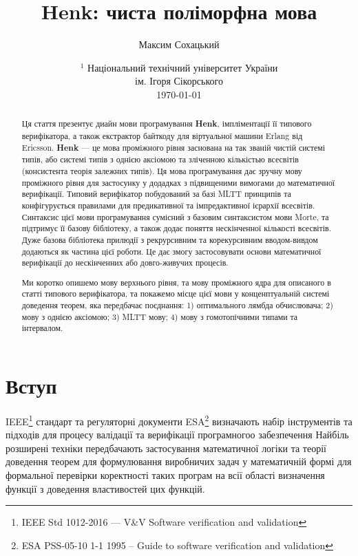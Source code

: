 \documentclass{article}
\begin{document}
\title{Henk: чиста поліморфна мова}
\author{Максим Сохацький}
\date{ $^1$ Національний технічний університет України \\
       \small ім. Ігоря Сікорського\\
       \today }

\maketitle

\begin{abstract}
Ця стаття презентує диайн мови програмування \textbf{Henk}, імпліментації її типового верифікатора,
а також екстрактор байткоду для віртуальної машини Erlang від Ericsson. \textbf{Henk} — це
мова проміжного рівня заснована на так званій чистій системі типів, або системі типів з однією аксіомою та
зліченною кількістью всесвітів (консистента теорія залежних типів). Ця мова програмування дає зручну
мову проміжного рівня для застосунку у додадках з підвищеними вимогами до математичної верифікації.
Типовий верифікатор побудований за базі MLTT принципів та конфігурується правилами для предикативної та імпредактивної ієрархії всесвітів.
Синтаксис цієї мови програмування сумісний з базовим синтаксистом мови Morte, та підтримує її базову бібліотеку,
а також додає поняття нескінченної кількості всесвітів. Дуже базова бібліотека прилюдії з рекрурсивним та
корекурсивним вводом-вивдом додаються як частина цієї роботи. Це дає змогу застосовувати основи
математичної верифікації до нескінченних або довго-живучих процесів.

Ми коротко опишемо мову верхнього рівня, та мову проміжного ядра для описаного в статті типового верифікатора,
та покажемо місце цієї мови у конценптуальній системі доведення теорем, яка передбачає поєднання: 1) оптимального лямбда обчислювача;
2) мову з однією аксіомою; 3) MLTT мову; 4) мову з гомотопічними типами та інтервалом.
\end{abstract}

\newpage
\tableofcontents
\newpage

\section{Вступ}
IEEE\footnote{IEEE Std 1012-2016  --- V\&V Software verification and validation} стандарт
та регуляторні документи ESA\footnote{ESA PSS-05-10 1-1 1995 -- Guide to software verification and validation} 
визначають набір інструментів та підходів для процесу валідації та верифікації програмногоо забезпечення
Найбіль розширені техніки передбачають застосування математичної логіки та теорії доведення теорем для
формулювання виробничих задач у математичній формі для формальної перевірки коректності таких програм на всії області визначення функції
з доведення властивостей цих функцій.
\end{document}

